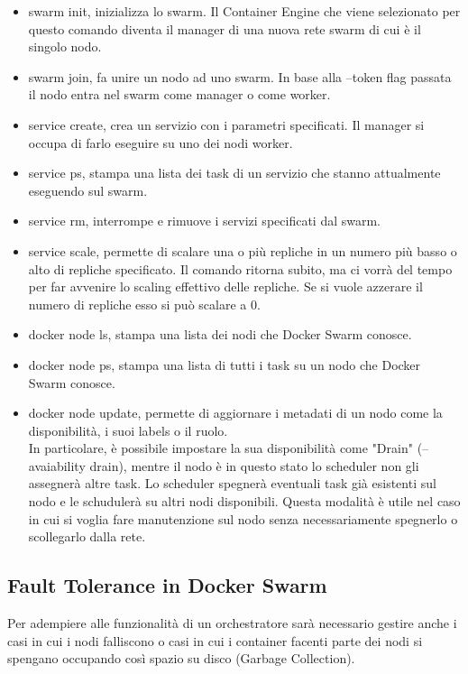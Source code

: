 \documentclass[12pt,a4paper]{article}
\begin{document}
\begin{itemize}
    \item swarm init, inizializza lo swarm. Il Container Engine che viene selezionato per questo comando diventa il manager di una nuova rete swarm di cui è il singolo nodo.
    \item swarm join, fa unire un nodo ad uno swarm. In base alla --token flag passata il nodo entra nel swarm come manager o come worker. \cite{docker_swarm_cli}\\
    
    \item service create, crea un servizio con i parametri specificati. Il manager si occupa di farlo eseguire su uno dei nodi worker.
    \item service ps, stampa una lista dei task di un servizio che stanno attualmente eseguendo sul swarm.
    \item service rm, interrompe e rimuove i servizi specificati dal swarm.
    \item service scale, permette di scalare una o più repliche in un numero più basso o alto di repliche specificato. Il comando ritorna subito, ma ci vorrà del tempo per far avvenire lo scaling effettivo delle repliche. Se si vuole azzerare il numero di repliche esso si può scalare a 0. \cite{docker_service_cli}\\
    
    \item docker node ls, stampa una lista dei nodi che Docker Swarm conosce.
    \item docker node ps, stampa una lista di tutti i task su un nodo che Docker Swarm conosce. \cite{docker_node_cli}
    \newpage
    \item docker node update, permette di aggiornare i metadati di un nodo come la disponibilità, i suoi labels o il ruolo. \\In particolare, è possibile impostare la sua disponibilità come "Drain" (--avaiability drain), mentre il nodo è in questo stato lo scheduler non gli assegnerà altre task. Lo scheduler spegnerà eventuali task già esistenti sul nodo e le schudulerà su altri nodi disponibili. Questa modalità è utile nel caso in cui si voglia fare manutenzione sul nodo senza necessariamente spegnerlo o scollegarlo dalla rete.\cite{docker_manage_nodes}
\end{itemize}

\subsection{Fault Tolerance in Docker Swarm}
Per adempiere alle funzionalità di un orchestratore sarà necessario gestire anche i casi in cui i nodi falliscono o casi in cui i container facenti parte dei nodi si spengano occupando così spazio su disco (Garbage Collection).
\end{document}
